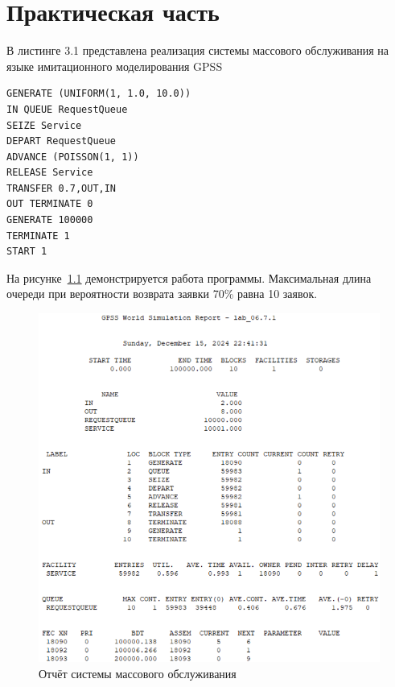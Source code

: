 \chapter{Практическая часть}


В листинге 3.1 представлена реализация системы массового обслуживания на языке имитационного моделирования GPSS

\begin{lstlisting}[caption=Реализация системы массового обслуживания]
GENERATE (UNIFORM(1, 1.0, 10.0))
IN QUEUE RequestQueue
SEIZE Service
DEPART RequestQueue
ADVANCE (POISSON(1, 1))
RELEASE Service
TRANSFER 0.7,OUT,IN
OUT TERMINATE 0
GENERATE 100000
TERMINATE 1
START 1
\end{lstlisting}

\clearpage

На рисунке~\ref{plt:gpss_res} демонстрируется работа программы. Максимальная длина очереди при вероятности возврата заявки 70\% равна 10 заявок.

\begin{figure}[h]
	\centering
	\includegraphics[height=0.55\textheight]{img/gpss_res.png}
	\caption{Отчёт системы массового обслуживания}
	\label{plt:gpss_res}
\end{figure}

